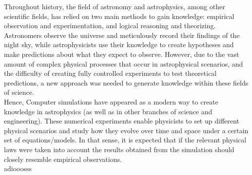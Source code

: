 Throughout history, the field of astronomy and astrophysics, among other scientific fields, has relied on two main methods to gain knowledge: empirical observation and experimentation, and logical reasoning and theorizing. Astronomers observe the universe and meticulously record their findings of the night sky, while astrophysicists use their knowledge to create hypotheses and make predictions about what they expect to observe. However, due to the vast amount of complex physical processes that occur in astrophysical scenarios, and the difficulty of creating fully controlled experiments to test theoretical predictions, a new approach was needed to generate knowledge within these fields of science.\\
Hence, Computer simulations have appeared as a modern way to create knowledge in astrophysics (as well as in other branches of science and engineering). These numerical experiments enable physicists to set up different physical scenarios and study how they evolve over time and space under a certain set of equations/models. In that sense, it is expected that if the relevant physical laws were taken into account the results obtained from the simulation should closely resemble empirical observations.\\



adiooosss	
